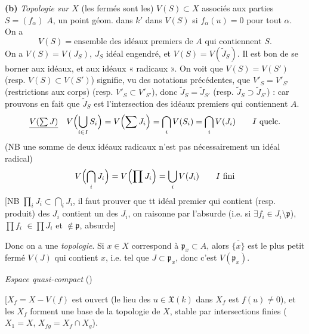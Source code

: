 \documentclass[11pt,a4paper]{article}
\begin{document}
\textbf{(b)} \emph{Topologie sur $X$} (les fermés sont les) $V(S) \subset X$ associés aux parties $S = (f_\alpha)$  $A$, \struck{\ill{}} un point géom.  dans $k'$  dans $V(S)$ \struck{\ill{}} si $f_\alpha(u) = 0$ pour tout $\alpha$. On a 
\[
V(S) = \text{ensemble des idéaux premiers de } A \text{ qui contiennent } S.
\]
On a $V(S) = V(J_S)$, $J_S$ idéal engendré, et  $V(S) = V(\widetilde{J}_S)$.  Il est bon de se borner aux idéaux, et  aux idéaux « radicaux ».  On voit que $V(S) = V(S')$ (resp. $V(S) \subset V(S')$) signifie, vu des notations précédentes, que $V'_S = V'_{S'}$ (restrictions aux corps)  (resp. $V'_S \subset V'_{S'}$), donc $\widetilde{J}_S = \widetilde{J}_{S'}$ (resp. $\widetilde{J}_S \supset \widetilde{J}_{S'}$) : car prouvons en fait que $\widetilde{J}_S$ est l'intersection des idéaux premiers qui contiennent $A$.
\[
\struck{V(\textstyle\sum J)} \quad V\Bigl(\bigcup_{i \in I} S_i\Bigr) = V\Bigl(\sum J_i\Bigr) = \bigcap_i V(S_i) = \bigcap_i V(J_i) \qquad I \text{ quelc.}
\]
(NB une  somme de deux idéaux \struck{\ill{}} radicaux n'est pas nécessairement un idéal radical)
\[
V\Bigl(\bigcap_i J_i\Bigr) = V\Bigl(\prod J_i\Bigr) = \bigcup_i V(J_i) \qquad I \text{ fini}
\]
[NB $\prod_i J_i \subset \bigcap_i J_i$, il faut prouver que tt idéal premier qui contient  (resp. produit) des $J_i$ contient un des $J_i$, on raisonne par l'absurde (i.e. si $\exists f_i \in J_i \setminus \mathfrak{p}$),  $\prod f_i$ \struck{\ill{}} $\in \prod J_i$ et $\notin \mathfrak{p}$, absurde] 

Donc on a une \emph{topologie}. Si $x \in X$ correspond à $\mathfrak{p}_x \subset A$, alors $\overline{\{x\}}$ est le plus petit fermé $V(J)$ qui contient $x$, i.e. tel que $J \subset \mathfrak{p}_x$, donc \struck{\ill{}} c'est $V(\mathfrak{p}_x)$.

\emph{Espace \struck{\ill{}} quasi-compact} \quad (\ill{})

[$X_f = X - V(f)$ est ouvert (le lieu des $u \in \mathfrak{X}(k)$ \ill{} dans $X_f$ est $f(u) \neq 0$), et les $X_f$ forment une base de la topologie de $X$, stable par intersections finies ($X_1 = X$, $X_{fg} = X_f \cap X_g$).
\end{document}
